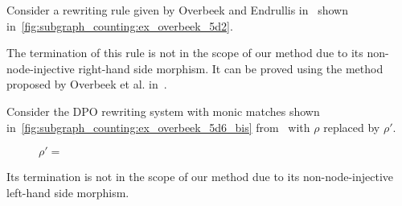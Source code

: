 \begin{example}[Limitation]
    \label{ex:overbeek:5d2:limitation}
    Consider a rewriting rule given by Overbeek and Endrullis in~\cite[Example 5.2]{overbeek2024termination_lmcs} shown in~\autoref{fig:subgraph_counting:ex_overbeek_5d2}.
  \begin{figure}[!ht]
    \centering
    \caption{}
    \label{fig:subgraph_counting:ex_overbeek_5d2}
  \end{figure}
    The termination of this rule is not in the scope of our method due to its non-node-injective right-hand side morphism. It can be proved using the method proposed by Overbeek et al. in~\cite{overbeek2024termination_lmcs}.
\end{example}
 
\begin{example}[Limitation]
  \label{ex:overbeek:5d6_bis:limitation} 
  Consider the DPO rewriting system with monic matches shown in~\autoref{fig:subgraph_counting:ex_overbeek_5d6_bis} from~\cite[Example 5.6]{overbeek2024termination_lmcs} with $\rho$ replaced by $\rho'$.
  \begin{figure}[!ht]
    \centering
    $\rho' = $\scalebox{0.9} { }
    \caption{}
    \label{fig:subgraph_counting:ex_overbeek_5d6_bis}
  \end{figure} 

  Its termination is not in the scope of our method due to its non-node-injective left-hand side morphism. 
\end{example}